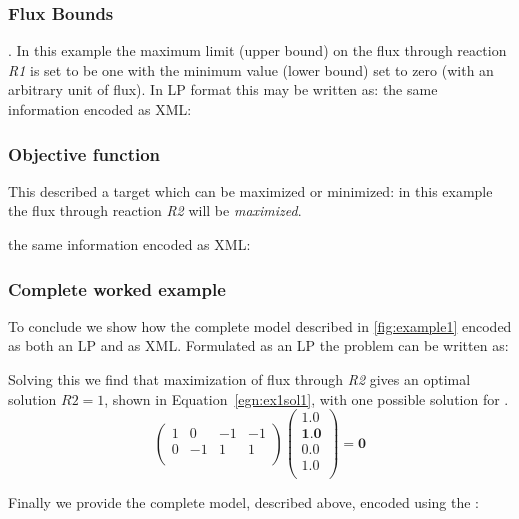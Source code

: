 \subsubsection{Flux Bounds}
\label{examples1:fluxbound}
. In this example the maximum limit (upper bound) on the flux through reaction \textit{R1} is set to be one with the minimum value (lower bound) set to zero (with an arbitrary unit of flux). In LP format this may be written as:
%
%
the same information encoded as XML:
%

\medskip
\subsubsection{Objective function}
\label{examples1:objfunc}
This described a target which can be maximized or minimized: in this
example the flux through reaction \textit{R2} will be
\textit{maximized}.

%
%
the same information encoded as XML:
%

\subsubsection{Complete worked example}
\label{examples1:complete}
To conclude we show how the complete model described in
\ref{fig:example1} encoded as both an LP and as XML. Formulated as an LP
the problem can be written as:

%
%
Solving this we find that maximization of flux through \textit{R2}
gives an optimal solution $R2 = 1$, shown in Equation~\ref{egn:ex1sol1}, with one possible solution
for \Jvec.
\begin{equation}\label{egn:ex1sol1}
  \left(
    \begin{array}{cccc}
        1 &  0 & -1 & -1 \\
        0 & -1 &  1 &  1 \\
    \end{array}
  \right)
  \left(
    \begin{array}{c}
        1.0 \\
        \textbf{1.0} \\
        0.0 \\
        1.0 \\
    \end{array}
  \right)
  = \textbf{0}
\end{equation}

Finally we provide the complete model, described above, encoded using the \FBCPackage:
%
